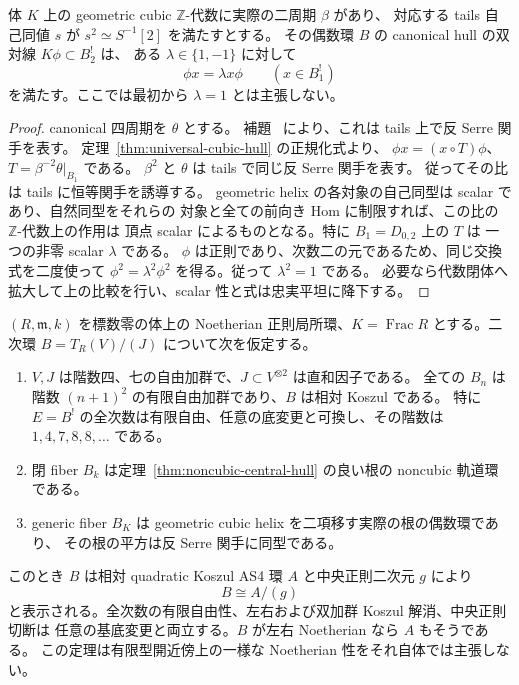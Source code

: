 \begin{lemma}
\label{lem:cubic-compatible-scalar-normalizer}
体 \(K\) 上の geometric cubic \(\mathbb Z\)-代数に実際の二周期 \(\beta\) があり、
対応する tails 自己同値 \(s\) が \(s^2\simeq S^{-1}[2]\) を満たすとする。
その偶数環 \(B\) の canonical hull の双対線 \(K\phi\subset B^!_2\) は、
ある \(\lambda\in\{1,-1\}\) に対して
\[
 \phi x=\lambda x\phi\qquad(x\in B^!_1)
\]
を満たす。ここでは最初から \(\lambda=1\) とは主張しない。
\end{lemma}
\begin{proof}
canonical 四周期を \(\theta\) とする。
補題~\cite[\texttt{lem:cubic-serre-period}]{QuadricIntrinsic2026} により、これは tails 上で反 Serre 関手を表す。
定理~\ref{thm:universal-cubic-hull} の正規化式より、
\(\phi x=(x\circ T)\phi\)、\(T=\beta^{-2}\theta|_{B_1}\) である。
\(\beta^2\) と \(\theta\) は tails で同じ反 Serre 関手を表す。
従ってその比は tails に恒等関手を誘導する。
geometric helix の各対象の自己同型は scalar であり、自然同型をそれらの
対象と全ての前向き Hom に制限すれば、この比の \(\mathbb Z\)-代数上の作用は
頂点 scalar によるものとなる。特に \(B_1=D_{0,2}\) 上の \(T\) は
一つの非零 scalar \(\lambda\) である。
\(\phi\) は正則であり、次数二の元であるため、同じ交換式を二度使って
\(\phi^2=\lambda^2\phi^2\) を得る。従って \(\lambda^2=1\) である。
必要なら代数閉体へ拡大して上の比較を行い、scalar 性と式は忠実平坦に降下する。
\end{proof}

\begin{theorem}
\label{thm:noncubic-local-central-hull}
\((R,\mathfrak m,k)\) を標数零の体上の Noetherian 正則局所環、\(K=\operatorname{Frac}R\)
とする。二次環 \(B=T_R(V)/(J)\) について次を仮定する。
\begin{enumerate}
\item \(V,J\) は階数四、七の自由加群で、\(J\subset V^{\otimes2}\) は直和因子である。
全ての \(B_n\) は階数 \((n+1)^2\) の有限自由加群であり、\(B\) は相対 Koszul である。
特に \(E=B^!\) の全次数は有限自由、任意の底変更と可換し、その階数は
\(1,4,7,8,8,\ldots\) である。
\item 閉 fiber \(B_k\) は定理~\ref{thm:noncubic-central-hull} の良い根の
noncubic 軌道環である。
\item generic fiber \(B_K\) は geometric cubic helix を二項移す実際の根の偶数環であり、
その根の平方は反 Serre 関手に同型である。
\end{enumerate}
このとき \(B\) は相対 quadratic Koszul AS4 環 \(A\) と中央正則二次元 \(g\) により
\[
 B\cong A/(g)
\]
と表示される。全次数の有限自由性、左右および双加群 Koszul 解消、中央正則切断は
任意の基底変更と両立する。\(B\) が左右 Noetherian なら \(A\) もそうである。
この定理は有限型開近傍上の一様な Noetherian 性をそれ自体では主張しない。
\end{theorem}

